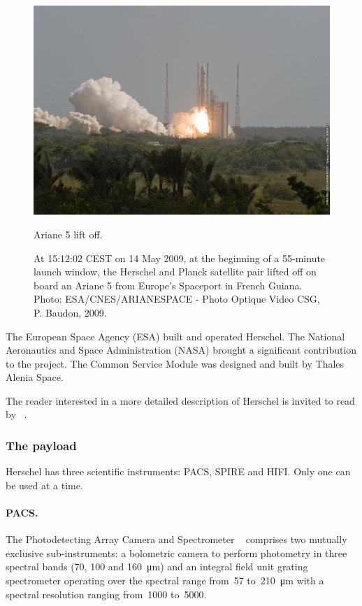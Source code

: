 \begin{figure}[hbtp]
    \centering
    \includegraphics[width=.8\textwidth]{ariane_5_lift_off}
    \caption{Ariane 5 lift off.}
    \caption*{
        At 15:12:02 CEST on 14 May 2009,
        at the beginning of a 55-minute launch window,
        the Herschel and Planck satellite pair lifted off on board an Ariane 5 from Europe's Spaceport in French Guiana.
    Photo: ESA/CNES/ARIANESPACE - Photo Optique Video CSG, P. Baudon, 2009.}
    \label{fig:ariane_5_lift_off}
\end{figure}

The European Space Agency (ESA) built and operated Herschel.
The National Aeronautics and Space Administration (NASA) brought a significant contribution to the project.
The Common Service Module was designed and built by Thales Alenia Space.

The reader interested in a more detailed description of Herschel is invited to read  by \citeauthor{AA_518_L1}~\cite{AA_518_L1}.

\subsubsection{The payload}

Herschel has three scientific instruments: PACS, SPIRE and HIFI.
Only one can be used at a time.

\paragraph{PACS.}The Photodetecting Array Camera and Spectrometer%
~\cite{poglitsch2010photodetector}
comprises two mutually exclusive sub-instruments: a bolometric camera to perform photometry in three spectral bands (\num{70}, \num{100} and \SI{160}{\micro\meter}) and an integral field unit grating spectrometer operating over the spectral range from~\num{57} to~\SI{210}{\micro\meter} with a spectral resolution ranging from~\num{1000} to~\num{5000}.

